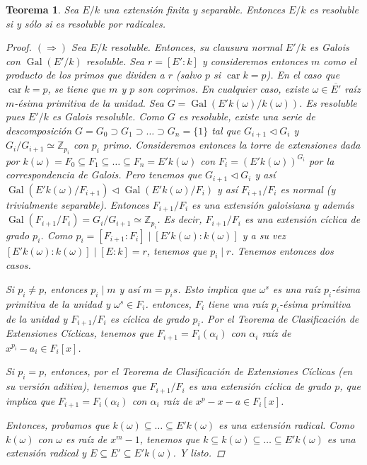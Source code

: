 \documentclass[12pt]{book}
\newtheorem{teo}{Teorema}[section]
\theoremstyle{definition}
\newcommand{\ZZ}{\mathbb{Z}}      %
\DeclareMathOperator{\car}{car}
\DeclareMathOperator{\Gal}{Gal}
\begin{document}
\begin{teo}
Sea $E/k$ una extensión finita y separable. Entonces $E/k$ es resoluble si y sólo si es resoluble por radicales.
\begin{proof}
$(\Longrightarrow)$ Sea $E/k$ resoluble. Entonces, su clausura normal $E'/k$ es Galois con $\Gal(E'/k)$ resoluble. Sea $r=[E':k]$ y consideremos entonces $m$ como el producto de los primos que dividen a $r$ (salvo $p$ si $\car k= p$). En el caso que $\car k =p$, se tiene que $m$ y $p$ son coprimos. En cualquier caso, existe $\omega\in \overline{E'}$ raíz $m$-ésima primitiva de la unidad. Sea $G=\Gal(E'k(\omega)/k(\omega))$. Es resoluble pues $E'/k$ es Galois resoluble. Como $G$ es resoluble, existe una serie de descomposición $G=G_0\supset G_1\supset\ldots\supset G_n=\{1\}$ tal que $G_{i+1}\triangleleft G_i$ y $G_i/G_{i+1}\simeq \ZZ_{p_i}$ con $p_i$ primo. Consideremos entonces la torre de extensiones dada por $k(\omega)=F_0\subseteq F_1\subseteq\ldots\subseteq F_n=E'k(\omega)$ con $F_i=(E'k(\omega))^{G_i}$ por la correspondencia de Galois. Pero tenemos que $G_{i+1}\triangleleft G_i$ y así $\Gal(E'k(\omega)/F_{i+1})\triangleleft \Gal(E'k(\omega)/F_i)$ y así $F_{i+1}/F_i$ es normal (y trivialmente separable). Entonces $F_{i+1}/F_i$ es una extensión galoisiana y además $\Gal(F_{i+1}/F_i) = G_i/G_{i+1}\simeq\ZZ_{p_i}$. Es decir, $F_{i+1}/F_i$ es una extensión cíclica de grado $p_i$. Como $p_i = [F_{i+1}:F_i]\mid [E'k(\omega):k(\omega)]$ y a su vez $[E'k(\omega):k(\omega)]\mid [E:k]=r$, tenemos que $p_i\mid r$. Tenemos entonces dos casos.

Si $p_i\neq p$, entonces $p_i\mid m$ y así $m=p_i s$. Esto implica que $\omega^s$ es una raíz $p_i$-ésima primitiva de la unidad y $\omega^s\in F_i$. entonces, $F_i$ tiene una raíz $p_i$-ésima primitiva de la unidad y $F_{i+1}/F_i$ es cíclica de grado $p_i$. Por el Teorema de Clasificación de Extensiones Cíclicas, tenemos que $F_{i+1} = F_i(\alpha_i)$ con $\alpha_i$ raíz de $x^{p_i}-a_i\in F_i[x]$.

Si $p_i=p$, entonces, por el Teorema de Clasificación de Extensiones Cíclicas (en su versión aditiva), tenemos que $F_{i+1}/F_i$ es una extensión cíclica de grado $p$, que implica que $F_{i+1} = F_i(\alpha_i)$ con $\alpha_i$ raíz de $x^p - x - a\in F_i[x]$.

Entonces, probamos que $k(\omega)\subseteq\ldots\subseteq E'k(\omega)$ es una extensión radical. Como $k(\omega)$ con $\omega$ es raíz de $x^m-1$, tenemos que $k\subseteq k(\omega)\subseteq\ldots\subseteq E'k(\omega)$ es una extensión radical y $E\subseteq E'\subseteq E'k(\omega)$. Y listo.


\end{proof}
\end{teo}
\end{document}
